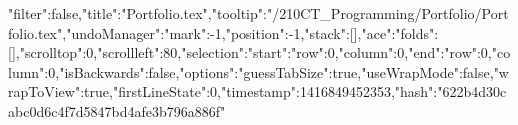 {"filter":false,"title":"Portfolio.tex","tooltip":"/210CT_Programming/Portfolio/Portfolio.tex","undoManager":{"mark":-1,"position":-1,"stack":[]},"ace":{"folds":[],"scrolltop":0,"scrollleft":80,"selection":{"start":{"row":0,"column":0},"end":{"row":0,"column":0},"isBackwards":false},"options":{"guessTabSize":true,"useWrapMode":false,"wrapToView":true},"firstLineState":0},"timestamp":1416849452353,"hash":"622b4d30cabc0d6c4f7d5847bd4afe3b796a886f"}